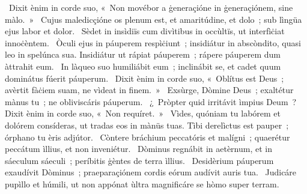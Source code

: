 {~Dixit ènim in corde suo, «~Non movébor a ġeneraçióne in ġeneraçiónem, sine màlo.~»
~Cujus maledicçióne os plenum est, et amaritúdine, et dolo~; sub lìngüa ejus labor et dolor.
~Sèdet in insìdiïs cum divìtibus in occùltïs, ut interfìċiat innoċèntem.
~Òculi ejus in páuperem respìċiunt~; insidiátur in abscòndito, quasi leo in spelúnca sua. Insidiátur ut rápiat páuperem~; rápere páuperem dum àttrahit eum.
~In làqueo suo humiliábit eum~; inclinábit se, et cadet quum dominátus fúerit páuperum.
~Dixit ènim in corde suo, «~Oblítus est Deus~; avèrtit fàċiem suam, ne vìdeat in finem.~»
~Exsùrge, Dòmine Deus~; exaltétur mànus tu~; ne obliviscáris páuperum.
~¿~Pròpter quid irritávit ìmpius Deum~? Dixit ènim in corde suo, «~Non requíret.~»
~Vìdes, quóniam tu labórem et dolórem consíderas, ut tradas eos in mànüs tuas. Tìbi derelìctus est pauper~; órphano tu èris adjútor.
~Còntere bráchium peccatóris et malígni~; quaerétur peccátum ìllius, et non inveniétur.
~Dòminus regnábit in aetèrnum, et in sáeculum sáeculi~; períbitis ġèntes de terra ìllius.
~Desidèrium páuperum exaudívit Dòminus~; praeparaçiónem cordis eórum audívit auris tua.
~Judicáre pupìllo et húmili, ut non appónat ùltra magnificáre se hòmo super terram.
}
